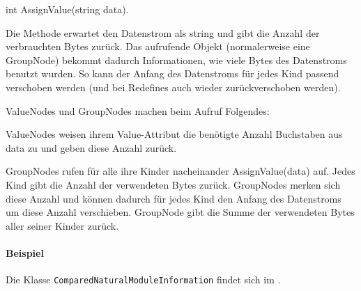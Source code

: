 int AssignValue(string data).

Die Methode erwartet den Datenstrom als string und gibt die Anzahl der verbrauchten Bytes zurück. Das aufrufende Objekt (normalerweise eine GroupNode) bekommt dadurch Informationen, wie viele Bytes des Datenstroms benutzt wurden. So kann der Anfang des Datenstroms für jedes Kind passend verschoben werden (und bei Redefines auch wieder zurückverschoben werden).

ValueNodes und GroupNodes machen beim Aufruf Folgendes:

ValueNodes weisen ihrem Value-Attribut die benötigte Anzahl Buchstaben aus data zu und geben diese Anzahl zurück.


GroupNodes rufen für alle ihre Kinder nacheinander AssignValue(data) auf. Jedes Kind gibt die Anzahl der verwendeten Bytes zurück. GroupNodes merken sich diese Anzahl und können dadurch für jedes Kind den Anfang des Datenstroms um diese Anzahl verschieben. GroupNode gibt die Summe der verwendeten Bytes aller seiner Kinder zurück.

\paragraph{Beispiel}
Die Klasse \texttt{Com\-par\-ed\-Na\-tu\-ral\-Mo\-dule\-In\-for\-ma\-tion} findet sich im .  






